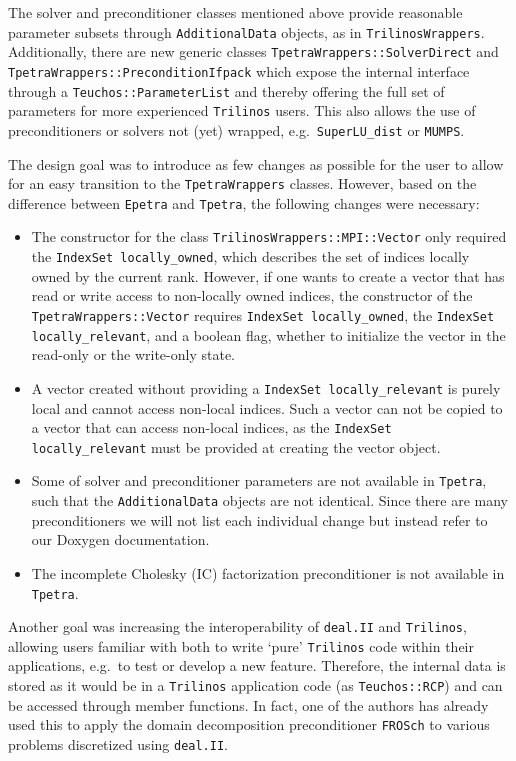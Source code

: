 \documentclass{ansarticle-preprint}
\newcommand{\specialword}[1]{\texttt{#1}}
\newcommand{\dealii}{{\specialword{deal.II}}\xspace}
\newcommand{\trilinos}{{\specialword{Trilinos}}\xspace}
\newcommand{\epetra}{{\specialword{Epetra}}\xspace}
\newcommand{\tpetra}{{\specialword{Tpetra}}\xspace}
\begin{document}
The solver and preconditioner classes mentioned above provide reasonable parameter subsets 
through \texttt{AdditionalData} objects, as in \texttt{TrilinosWrappers}. 
Additionally, there are new generic classes \texttt{TpetraWrappers::SolverDirect} 
and \texttt{TpetraWrappers::PreconditionIfpack} which expose the internal interface through
a \texttt{Teuchos::ParameterList} and thereby offering the full set of parameters for 
more experienced \trilinos{} users. This also allows the use of preconditioners or 
solvers not (yet) wrapped, e.g.\ \texttt{SuperLU\_dist} or \texttt{MUMPS}.

The design goal was to introduce as few changes as possible for the user to allow for an easy transition to the
\texttt{TpetraWrappers} classes.
However, based on the difference between \epetra{} and \tpetra{}, the following changes were necessary:
\begin{itemize}
  \item The constructor for the class \texttt{TrilinosWrappers::MPI::Vector} only required the \texttt{IndexSet locally\_owned},
    which describes the set of indices locally owned by the current rank.
    However, if one wants to create a vector that has read or write access to non-locally owned indices,  the constructor of the
    \texttt{TpetraWrappers::Vector} requires \texttt{IndexSet locally\_owned}, the \texttt{IndexSet locally\_relevant}, and
    a boolean flag, whether to initialize the vector in the read-only or the write-only state.
  \item A vector created without providing a \texttt{IndexSet locally\_relevant} is purely local and cannot access non-local indices.
    Such a vector can not be copied to a vector that can access non-local indices, as the \texttt{IndexSet locally\_relevant} must
    be provided at creating the vector object. 
  \item Some of solver and preconditioner parameters are not available in \tpetra{},
    such that the \texttt{AdditionalData} objects are not identical. 
    Since there are many preconditioners we will not list each individual change but instead refer 
    to our Doxygen documentation. 
  \item The incomplete Cholesky (IC) factorization preconditioner is not available 
   in \tpetra{}.
\end{itemize}

Another goal was increasing the interoperability of \dealii{} and \trilinos{},
allowing users familiar with both to write `pure' \trilinos{} code within their 
applications, e.g.\ to test or develop a new feature.
Therefore, the internal data is stored as it would be in a \trilinos{} 
application code (as \texttt{Teuchos::RCP}) and can be accessed through member functions. 
In fact, one of the authors has already used this to apply the domain decomposition preconditioner
\texttt{FROSch} to various problems discretized using \dealii{}.
\end{document}
